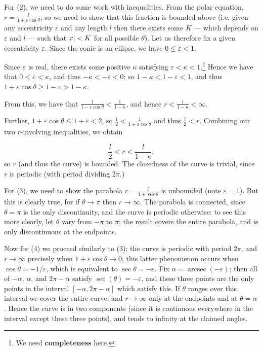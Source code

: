 \documentclass[a4paper,leqno,10pt]{article}
\theoremstyle{exercise}
\theoremstyle{plain}
\theoremstyle{definition}
\theoremstyle{remark}
\newcommand{\df}{\textbf}
\DeclareMathOperator{\arcsec}{arcsec}
\begin{document}
For (2), we need to do some work with inequalities. From the polar equation, $ r = \frac{l}{1 + \varepsilon \cos \theta} $;
so we need to show that this fraction is bounded above (i.e. given any eccentricity $ \varepsilon $ and any length $ l $ then there exists some $ K $ --- which
depends on $ \varepsilon $ and $ l $ --- such that $ \abs{r} < K $ for all possible $ \theta $). Let us therefore fix a given eccentricity $ \varepsilon $. Since
the conic is an ellipse, we have $ 0 \leq \varepsilon < 1 $.

Since $ \varepsilon $ is real, there exists some positive $ \kappa $ satisfying $ \varepsilon < \kappa < 1 $.\footnote{We need \df{completeness} here.}
Hence we have that $ 0 < \varepsilon < \kappa $, and thus $ -\kappa < -\varepsilon < 0 $; so $ 1 - \kappa < 1 - \varepsilon < 1 $,
and thus $ 1 + \varepsilon \cos \theta \geq 1 - \varepsilon > 1 - \kappa $.

From this, we have that $ \frac{1}{1 - \varepsilon \cos \theta} < \frac{1}{1 - \kappa} $, and hence $ r < \frac{l}{1 - \kappa} < \infty $.

Further, $ 1 + \varepsilon \cos \theta \leq 1 + \varepsilon < 2 $, so $ \frac{1}{2} < \frac{1}{1 + \varepsilon \cos \theta} $ and
thus $ \frac{l}{2} < r $. Combining our two $ r$-involving inequalities, we obtain

\begin{displaymath}
  \frac{l}{2} < r < \frac{l}{1 - \kappa};
\end{displaymath}
so $ r $ (and thus the curve) is bounded. The closedness of the curve is trivial, since $ r $ is periodic (with period dividing $ 2\pi $.)

For (3), we need to show the parabola $ r = \frac{l}{1 + \cos \theta} $ is unbounded (note $ \varepsilon = 1 $). But this is clearly
true, for if $ \theta \to \pi $ then $ r \to \infty $. The parabola is connected, since $ \theta = \pi $ is the only discontinuity,
and the curve is periodic otherwise: to see this more clearly, let $ \theta $ vary from $ -\pi $ to $ \pi $; the result covers the entire
parabola, and is only discontinuous at the endpoints.

Now for (4) we proceed similarly to (3); the curve is periodic with period $ 2\pi $, and $ r \to \infty $ precisely
when $ 1 + \varepsilon \cos \theta \to 0 $; this latter phenomenon occurs when $ \cos \theta = -1/\varepsilon $,
which is equivalent to $ \sec \theta = -\varepsilon $. Fix $ \alpha = \arcsec(-\varepsilon) $; then all of $ -\alpha $, $ \alpha $,
and $ 2\pi - \alpha $ satisfy $ \sec(\theta) = -\varepsilon $, and these three points are the only points in the interval $ [-\alpha, 2\pi - \alpha] $
which satisfy this. If $ \theta $ ranges over this interval we cover the entire curve, and $ r \to \infty $ only at the endpoints and
at $ \theta = \alpha $. Hence the curve is in two components (since it is continuous everywhere in the interval except these three points),
and tends to infinity at the claimed angles.
\end{document}
